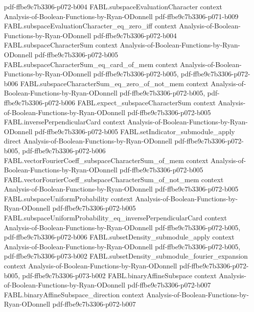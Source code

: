 \begin{theorem}
  {pdf-ffbe9c7b3306-p072-b004}
\proofstep
  {FABL.subspaceEvaluationCharacter}
  {context}
  {Analysis-of-Boolean-Functions-by-Ryan-ODonnell}
  {pdf-ffbe9c7b3306-p071-b009}
\proofstep
  {FABL.subspaceEvaluationCharacter_eq_zero_iff}
  {context}
  {Analysis-of-Boolean-Functions-by-Ryan-ODonnell}
  {pdf-ffbe9c7b3306-p072-b004}
\proofstep
  {FABL.subspaceCharacterSum}
  {context}
  {Analysis-of-Boolean-Functions-by-Ryan-ODonnell}
  {pdf-ffbe9c7b3306-p072-b005}
\proofstep
  {FABL.subspaceCharacterSum_eq_card_of_mem}
  {context}
  {Analysis-of-Boolean-Functions-by-Ryan-ODonnell}
  {pdf-ffbe9c7b3306-p072-b005,
    pdf-ffbe9c7b3306-p072-b006}
\proofstep
  {FABL.subspaceCharacterSum_eq_zero_of_not_mem}
  {context}
  {Analysis-of-Boolean-Functions-by-Ryan-ODonnell}
  {pdf-ffbe9c7b3306-p072-b005,
    pdf-ffbe9c7b3306-p072-b006}
\proofstep
  {FABL.expect_subspaceCharacterSum}
  {context}
  {Analysis-of-Boolean-Functions-by-Ryan-ODonnell}
  {pdf-ffbe9c7b3306-p072-b005}
\proofstep
  {FABL.inversePerpendicularCard}
  {context}
  {Analysis-of-Boolean-Functions-by-Ryan-ODonnell}
  {pdf-ffbe9c7b3306-p072-b005}
\proofstep
  {FABL.setIndicator_submodule_apply}
  {direct}
  {Analysis-of-Boolean-Functions-by-Ryan-ODonnell}
  {pdf-ffbe9c7b3306-p072-b005,
    pdf-ffbe9c7b3306-p072-b006}
\proofstep
  {FABL.vectorFourierCoeff_subspaceCharacterSum_of_mem}
  {context}
  {Analysis-of-Boolean-Functions-by-Ryan-ODonnell}
  {pdf-ffbe9c7b3306-p072-b005}
\proofstep
  {FABL.vectorFourierCoeff_subspaceCharacterSum_of_not_mem}
  {context}
  {Analysis-of-Boolean-Functions-by-Ryan-ODonnell}
  {pdf-ffbe9c7b3306-p072-b005}
\proofstep
  {FABL.subspaceUniformProbability}
  {context}
  {Analysis-of-Boolean-Functions-by-Ryan-ODonnell}
  {pdf-ffbe9c7b3306-p072-b005}
\proofstep
  {FABL.subspaceUniformProbability_eq_inversePerpendicularCard}
  {context}
  {Analysis-of-Boolean-Functions-by-Ryan-ODonnell}
  {pdf-ffbe9c7b3306-p072-b005,
    pdf-ffbe9c7b3306-p072-b006}
\proofstep
  {FABL.subsetDensity_submodule_apply}
  {context}
  {Analysis-of-Boolean-Functions-by-Ryan-ODonnell}
  {pdf-ffbe9c7b3306-p072-b005,
    pdf-ffbe9c7b3306-p073-b002}
\proofstep
  {FABL.subsetDensity_submodule_fourier_expansion}
  {context}
  {Analysis-of-Boolean-Functions-by-Ryan-ODonnell}
  {pdf-ffbe9c7b3306-p072-b005,
    pdf-ffbe9c7b3306-p073-b002}
\proofstep
  {FABL.binaryAffineSubspace}
  {context}
  {Analysis-of-Boolean-Functions-by-Ryan-ODonnell}
  {pdf-ffbe9c7b3306-p072-b007}
\proofstep
  {FABL.binaryAffineSubspace_direction}
  {context}
  {Analysis-of-Boolean-Functions-by-Ryan-ODonnell}
  {pdf-ffbe9c7b3306-p072-b007}
\proofstep

\end{theorem}
